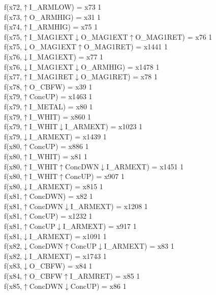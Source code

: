 f(x72,$\uparrow$I\_ARMLOW) = x73 {1} \\
f(x73,$\uparrow$O\_ARMHIG) = x31 {1} \\
f(x74,$\uparrow$I\_ARMHIG) = x75 {1} \\
f(x75,$\uparrow$I\_MAG1EXT$\downarrow$O\_MAG1EXT$\uparrow$O\_MAG1RET) = x76 {1} \\
f(x75,$\downarrow$O\_MAG1EXT$\uparrow$O\_MAG1RET) = x1441 {1} \\
f(x76,$\downarrow$I\_MAG1EXT) = x77 {1} \\
f(x76,$\downarrow$I\_MAG1EXT$\downarrow$O\_ARMHIG) = x1478 {1} \\
f(x77,$\uparrow$I\_MAG1RET$\downarrow$O\_MAG1RET) = x78 {1} \\
f(x78,$\uparrow$O\_CBFW) = x39 {1} \\
f(x79,$\uparrow$ConcUP) = x1463 {1} \\
f(x79,$\uparrow$I\_METAL) = x80 {1} \\
f(x79,$\uparrow$I\_WHIT) = x860 {1} \\
f(x79,$\uparrow$I\_WHIT$\downarrow$I\_ARMEXT) = x1023 {1} \\
f(x79,$\downarrow$I\_ARMEXT) = x1439 {1} \\
f(x80,$\uparrow$ConcUP) = x886 {1} \\
f(x80,$\uparrow$I\_WHIT) = x81 {1} \\
f(x80,$\uparrow$I\_WHIT$\uparrow$ConcDWN$\downarrow$I\_ARMEXT) = x1451 {1} \\
f(x80,$\uparrow$I\_WHIT$\uparrow$ConcUP) = x907 {1} \\
f(x80,$\downarrow$I\_ARMEXT) = x815 {1} \\
f(x81,$\uparrow$ConcDWN) = x82 {1} \\
f(x81,$\uparrow$ConcDWN$\downarrow$I\_ARMEXT) = x1208 {1} \\
f(x81,$\uparrow$ConcUP) = x1232 {1} \\
f(x81,$\uparrow$ConcUP$\downarrow$I\_ARMEXT) = x917 {1} \\
f(x81,$\downarrow$I\_ARMEXT) = x1091 {1} \\
f(x82,$\downarrow$ConcDWN$\uparrow$ConcUP$\downarrow$I\_ARMEXT) = x83 {1} \\
f(x82,$\downarrow$I\_ARMEXT) = x1743 {1} \\
f(x83,$\downarrow$O\_CBFW) = x84 {1} \\
f(x84,$\uparrow$O\_CBFW$\uparrow$I\_ARMRET) = x85 {1} \\
f(x85,$\uparrow$ConcDWN$\downarrow$ConcUP) = x86 {1} \\
